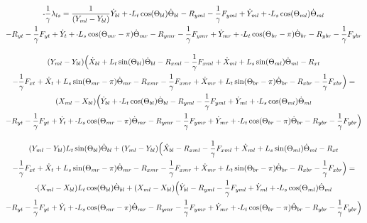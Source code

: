 \documentclass[11pt, landscape]{article}
\newcommand{\mn}{\scalebox{0.7}[1.0]{-}}
\begin{document}
\begin{multline}
\mn\frac{1}{\gamma}\lambda_{ls} =
\frac{1}{(Y_{ml} - Y_{bl})}\dot{Y}_{bl} + \mn L_{t}\cos(\Theta_{bl})      \dot{\Theta}_{bl} - R_{yml} - \frac{1}{\gamma}F_{yml} + \dot{Y}_{ml} + \mn L_{s}\cos(\Theta_{ml}) \dot{\Theta}_{ml} \\
- R_{yt} - \frac{1}{\gamma}F_{yt } + \dot{Y}_{t } + \mn L_{s}\cos(\Theta_{mr}-\pi)  \dot{\Theta}_{mr} - R_{ymr} - \frac{1}{\gamma}F_{ymr} + \dot{Y}_{mr}
+ \mn L_{t}\cos(\Theta_{br}-\pi)  \dot{\Theta}_{br} - R_{ybr} - \frac{1}{\gamma}F_{ybr}
\end{multline}

\begin{multline}
(Y_{ml} - Y_{bl})\Big( \dot{X}_{bl} + L_{t}\sin(\Theta_{bl})      \dot{\Theta}_{bl} - R_{xml} - \frac{1}{\gamma}F_{xml} + \dot{X}_{ml} + L_{s}\sin(\Theta_{ml}) \dot{\Theta}_{ml} - R_{xt } \\
- \frac{1}{\gamma}F_{xt } + \dot{X}_{t } + L_{s}\sin(\Theta_{mr}-\pi)  \dot{\Theta}_{mr} - R_{xmr} 
-\frac{1}{\gamma}F_{xmr} + \dot{X}_{mr} + L_{t}\sin(\Theta_{br}-\pi)  \dot{\Theta}_{br} - R_{xbr} - \frac{1}{\gamma}F_{xbr} \Big) = \\
(X_{ml} - X_{bl})\Big( \dot{Y}_{bl} + \mn L_{t}\cos(\Theta_{bl})      \dot{\Theta}_{bl} - R_{yml} - \frac{1}{\gamma}F_{yml} + \dot{Y}_{ml} + \mn L_{s}\cos(\Theta_{ml}) \dot{\Theta}_{ml} \\
- R_{yt} - \frac{1}{\gamma}F_{yt } + \dot{Y}_{t } + \mn L_{s}\cos(\Theta_{mr}-\pi)  \dot{\Theta}_{mr} - R_{ymr} - \frac{1}{\gamma}F_{ymr} + \dot{Y}_{mr}
+ \mn L_{t}\cos(\Theta_{br}-\pi)  \dot{\Theta}_{br} - R_{ybr} - \frac{1}{\gamma}F_{ybr} \Big)
\end{multline}

\begin{multline}
(Y_{ml} - Y_{bl})L_{t}\sin(\Theta_{bl}) \dot{\Theta}_{bl} + (Y_{ml} - Y_{bl})\Big( \dot{X}_{bl} - R_{xml} - \frac{1}{\gamma}F_{xml} + \dot{X}_{ml} + L_{s}\sin(\Theta_{ml}) \dot{\Theta}_{ml} - R_{xt } \\
- \frac{1}{\gamma}F_{xt } + \dot{X}_{t } + L_{s}\sin(\Theta_{mr}-\pi)  \dot{\Theta}_{mr} - R_{xmr} 
-\frac{1}{\gamma}F_{xmr} + \dot{X}_{mr} + L_{t}\sin(\Theta_{br}-\pi)  \dot{\Theta}_{br} - R_{xbr} - \frac{1}{\gamma}F_{xbr} \Big) = \\
\mn (X_{ml} - X_{bl}) L_{t}\cos(\Theta_{bl}) \dot{\Theta}_{bl} + (X_{ml} - X_{bl})\Big( \dot{Y}_{bl} - R_{yml} - \frac{1}{\gamma}F_{yml} + \dot{Y}_{ml} + \mn L_{s}\cos(\Theta_{ml}) \dot{\Theta}_{ml} \\
- R_{yt} - \frac{1}{\gamma}F_{yt } + \dot{Y}_{t } + \mn L_{s}\cos(\Theta_{mr}-\pi)  \dot{\Theta}_{mr} - R_{ymr} - \frac{1}{\gamma}F_{ymr} + \dot{Y}_{mr}
+ \mn L_{t}\cos(\Theta_{br}-\pi)  \dot{\Theta}_{br} - R_{ybr} - \frac{1}{\gamma}F_{ybr} \Big)
\end{multline}
\end{document}
